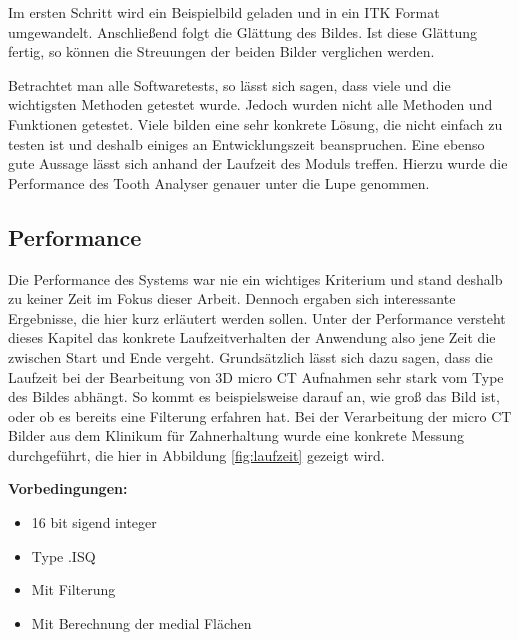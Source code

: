 Im ersten Schritt wird ein Beispielbild geladen und in ein \ac{ITK} Format
umgewandelt. Anschließend folgt die Glättung des Bildes. Ist diese Glättung
fertig, so können die Streuungen der beiden Bilder verglichen werden.

Betrachtet man alle Softwaretests, so lässt sich sagen, dass viele und die wichtigsten
Methoden getestet wurde. Jedoch wurden nicht alle Methoden und Funktionen
getestet. Viele bilden eine sehr konkrete Lösung, die nicht einfach zu testen
ist und deshalb einiges an Entwicklungszeit beanspruchen. Eine ebenso gute Aussage
lässt sich anhand der Laufzeit des Moduls treffen. Hierzu wurde die Performance
des Tooth Analyser genauer unter die Lupe genommen.

\pagebreak

\subsection{Performance}
Die Performance des Systems war nie ein wichtiges Kriterium und stand deshalb zu
keiner Zeit im Fokus dieser Arbeit. Dennoch ergaben sich interessante Ergebnisse,
die hier kurz erläutert werden sollen. Unter der Performance versteht dieses
Kapitel das konkrete Laufzeitverhalten der Anwendung also jene Zeit die zwischen
Start und Ende vergeht. Grundsätzlich lässt sich dazu sagen, dass die Laufzeit
bei der Bearbeitung von 3D micro CT Aufnahmen sehr stark vom Type des Bildes
abhängt. So kommt es beispielsweise darauf an, wie groß das Bild ist, oder ob es
bereits eine Filterung erfahren hat. Bei der Verarbeitung der micro CT Bilder
aus dem Klinikum für Zahnerhaltung wurde eine konkrete Messung durchgeführt, die
hier in Abbildung \ref{fig:laufzeit} gezeigt wird.

\textbf{Vorbedingungen:}
\begin{itemize}
	\item 16 bit sigend integer

	\item Type .ISQ

	\item Mit Filterung

	\item Mit Berechnung der medial Flächen
\end{itemize}

